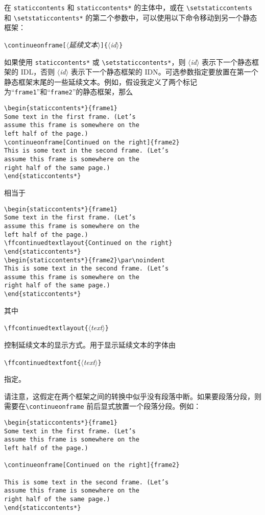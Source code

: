 \documentclass[a4paper]{book}%
\newcommand{\meta}[1]{\textnormal{\ensuremath{\langle}\makebox[0pt][l]{}\emph{#1}\makebox[0pt][l]{}\ensuremath{\rangle}}}
\newcommand{\cmd}[1]{\texttt{#1}}
\begin{document}
在 \cmd{staticcontents} 和 \cmd{staticcontents*} 的主体中，或在 \verb|\setstaticcontents| 和 \verb|\setstaticcontents*| 的第二个参数中，可以使用以下命令移动到另一个静态框架：
\begin{mdframed}
\verb|\continueonframe[|\meta{延续文本}\verb|]{|\meta{id}\verb|}|
\end{mdframed}
如果使用 \cmd{staticcontents*} 或 \verb|\setstaticcontents*|，则 \meta{id} 表示下一个静态框架的 IDL，否则 \meta{id} 表示下一个静态框架的 IDN。可选参数指定要放置在第一个静态框架末尾的一些延续文本。例如，假设我定义了两个标记为“\cmd{frame1}”和“\cmd{frame2}”的静态框架，那么
\begin{lstlisting}[backgroundcolor=\color{white}]
\begin{staticcontents*}{frame1}
Some text in the first frame. (Let’s
assume this frame is somewhere on the
left half of the page.)
\continueonframe[Continued on the right]{frame2}
This is some text in the second frame. (Let’s
assume this frame is somewhere on the
right half of the same page.)
\end{staticcontents*}
\end{lstlisting}
相当于
\begin{lstlisting}[backgroundcolor=\color{white}]
\begin{staticcontents*}{frame1}
Some text in the first frame. (Let’s
assume this frame is somewhere on the
left half of the page.)
\ffcontinuedtextlayout{Continued on the right}
\end{staticcontents*}
\begin{staticcontents*}{frame2}\par\noindent
This is some text in the second frame. (Let’s
assume this frame is somewhere on the
right half of the same page.)
\end{staticcontents*}
\end{lstlisting}
其中
\begin{mdframed}
\verb|\ffcontinuedtextlayout{|\meta{text}\verb|}|
\end{mdframed}
控制延续文本的显示方式。用于显示延续文本的字体由
\begin{mdframed}
\verb|\ffcontinuedtextfont{|\meta{text}\verb|}|
\end{mdframed}
指定。

请注意，这假定在两个框架之间的转换中似乎没有段落中断。如果要段落分段，则需要在\verb|\continueonframe| 前后显式放置一个段落分段。例如：
\begin{lstlisting}[backgroundcolor=\color{white}]
\begin{staticcontents*}{frame1}
Some text in the first frame. (Let’s
assume this frame is somewhere on the
left half of the page.)

\continueonframe[Continued on the right]{frame2}

This is some text in the second frame. (Let’s
assume this frame is somewhere on the
right half of the same page.)
\end{staticcontents*}
\end{lstlisting}
\end{document}
